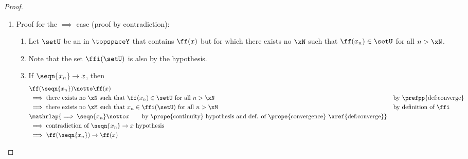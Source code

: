 \begin{proof}
\begin{enumerate}
  \item Proof for the $\implies$ case (proof by contradiction):
    \begin{enumerate}
      \item Let $\setU$ be an  in $\topspaceY$ that contains $\ff(x)$ but for which 
            there exists no $\xN$ such that $\ff(x_n)\in\setU$ for all $n>\xN$.
      \item Note that the set $\ffi(\setU)$ is also  by the  hypothesis.
      \item If $\seqn{x_n}\to x$, then
      \begin{align*}
        &\ff(\seqn{x_n})\notto \ff(x)
        \\&\implies \text{there exists no $\xN$ such that $\ff(x_n)\in\setU$ for all $n>\xN$}
          &&\text{by \prefpp{def:converge}}
        \\&\implies \text{there exists no $\xM$ such that $x_n\in\ffi(\setU)$ for all $n>\xM$}
          &&\text{by definition of $\ffi$}
        \\&\mathrlap{\implies \seqn{x_n}\notto x 
          \qquad\text{by \prope{continuity} hypothesis and def. of \prope{convergence} \xref{def:converge}}}
        \\&\implies \text{contradiction of $\seqn{x_n}\to x$ hypothesis}
        \\&\implies \ff(\seqn{x_n})\to \ff(x)
      \end{align*}
    \end{enumerate}


\end{enumerate}
\end{proof}
